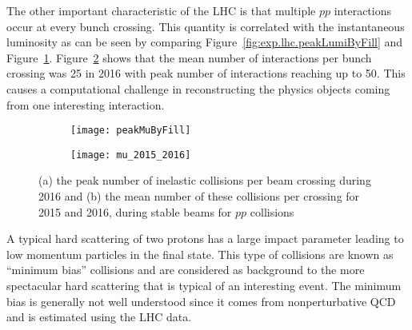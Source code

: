 The other important characteristic of the LHC is that multiple $pp$ interactions occur at every 
bunch crossing.  This quantity is correlated with the instantaneous luminosity as can be seen 
by comparing Figure~\ref{fig:exp.lhc.peakLumiByFill} and Figure~\ref{fig:exp.lhc.peakMuByFill}. Figure~\ref{fig:exp.mu_2015_2016}
shows that the mean number of interactions per bunch crossing was 25 in 2016 with peak number of interactions 
reaching up to 50. This causes a computational challenge in reconstructing the physics objects coming from 
one interesting interaction.
\begin{figure}[!htb]
\centering
\begin{subfigure}[t]{0.48\textwidth}
\texttt{[image: peakMuByFill]}
\subcaption{}
\label{fig:exp.lhc.peakMuByFill}
\end{subfigure}
\begin{subfigure}[t]{0.48\textwidth}
\texttt{[image: mu\_2015\_2016]}
\subcaption{}
\label{fig:exp.mu_2015_2016}
\end{subfigure}
\vspace{-0.25cm}
\caption{(a) the peak number of inelastic collisions per beam crossing during 2016 
  and (b) the mean number of these collisions per crossing for 2015 and 2016, during stable beams for $pp$ collisions}
\label{fig:exp.lhc.int}
\end{figure} 
A typical hard scattering of two protons has a large impact parameter leading to low momentum particles in the final 
state. This type of collisions are known as ``minimum bias'' collisions and are considered as background to 
the more spectacular hard scattering that is typical of an interesting event. 
The minimum bias is generally not well understood since it comes from nonperturbative QCD and is estimated 
using the LHC data.


